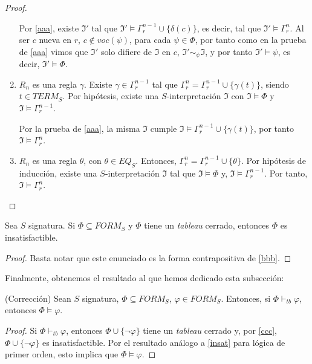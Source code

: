 \begin{proof}
\begin{enumerate}
    Por \ref{aaa}, existe $\mathfrak{I}'$ tal que $\mathfrak{I}' \vDash \Gamma_{r}^{n-1} \cup \{\delta(c)\}$, es decir, tal que $\mathfrak{I}' \vDash \Gamma_{r}^{n}$. Al ser $c$ nueva en $r$, $c \notin voc(\psi)$, para cada $\psi \in \Phi$, por tanto como en la prueba de \ref{aaa} vimos que $\mathfrak{I}'$ solo difiere de $\mathfrak{I}$ en $c$, $\mathfrak{I}' \sim_{\psi} \mathfrak{I}$, y por tanto $\mathfrak{I}' \vDash \psi$, es decir, $\mathfrak{I}' \vDash \Phi$.
    
    \item $R_n$ es una regla $\gamma$. Existe $\gamma \in \Gamma_{r}^{n-1}$ tal que $\Gamma_{r}^{n} = \Gamma_{r}^{n-1} \cup \{\gamma(t)\}$, siendo $t \in TERM_S$. Por hipótesis, existe una $S$-interpretación $\mathfrak{I}$ con $\mathfrak{I} \vDash \Phi$ y $\mathfrak{I} \vDash \Gamma_{r}^{n-1}$. 
    
    Por la prueba de \ref{aaa}, la misma $\mathfrak{I}$ cumple $\mathfrak{I} \vDash \Gamma_{r}^{n-1} \cup \{\gamma(t)\}$, por tanto $\mathfrak{I} \vDash \Gamma_{r}^n$.
    
    \item $R_n$ es una regla $\theta$, con $\theta \in EQ_S$. Entonces, $\Gamma_{r}^{n} = \Gamma_{r}^{n-1} \cup \{\theta\}$. Por hipótesis de inducción, existe una $S$-interpretación $\mathfrak{I}$ tal que $\mathfrak{I} \vDash \Phi$ y, $\mathfrak{I} \vDash \Gamma_{r}^{n-1}$. Por tanto, $\mathfrak{I} \vDash \Gamma_{r}^n$.
\end{enumerate}
\end{proof}

\begin{cor}\label{ccc}
Sea $S$ signatura. Si $\Phi \subseteq FORM_S$ y $\Phi$ tiene un \textit{tableau} cerrado, entonces $\Phi$ es insatisfactible. 
\end{cor}
\begin{proof}
Basta notar que este enunciado es la forma contrapositiva de \ref{bbb}.
\end{proof}

Finalmente, obtenemos el resultado al que hemos dedicado esta subsección:

\begin{cor}(Corrección)
Sean $S$ signatura, $\Phi \subseteq FORM_S$, $\varphi \in FORM_S$. Entonces, si $\Phi \vdash_{tb} \varphi$, entonces $\Phi \vDash \varphi$.
\end{cor}
\begin{proof}
Si $\Phi \vdash_{tb} \varphi$, entonces $\Phi \cup \{\neg \varphi \}$ tiene un \textit{tableau} cerrado y, por \ref{ccc}, $\Phi \cup \{\neg \varphi \}$ es insatisfactible. Por el resultado análogo a \ref{insat} para lógica de primer orden, esto implica que $\Phi \vDash \varphi$.
\end{proof}


